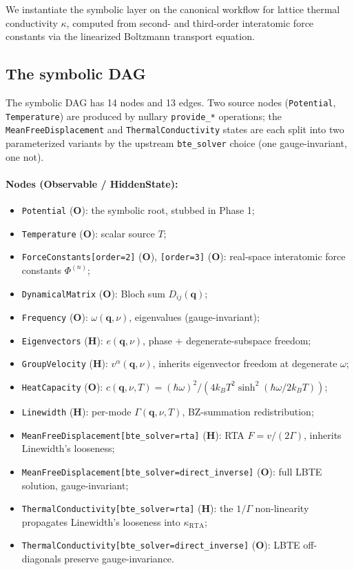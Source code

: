 \documentclass[11pt,a4paper]{article}
\begin{document}
We instantiate the symbolic layer on the canonical workflow for lattice thermal conductivity $\kappa$,
computed from second- and third-order interatomic force constants via the linearized Boltzmann
transport equation.

\subsection{The symbolic DAG}

The symbolic DAG has 14 nodes and 13 edges. Two source nodes (\texttt{Potential},
\texttt{Temperature}) are produced by nullary \texttt{provide\_*} operations; the
\texttt{MeanFreeDisplacement} and \texttt{ThermalConductivity} states are each split
into two parameterized variants by the upstream \texttt{bte\_solver} choice (one
gauge-invariant, one not).

\paragraph{Nodes (Observable / HiddenState):}
\begin{itemize}[leftmargin=2em, itemsep=0.2em]
  \item \texttt{Potential} (\textbf{O}): the symbolic root, stubbed in Phase 1;
  \item \texttt{Temperature} (\textbf{O}): scalar source $T$;
  \item \texttt{ForceConstants[order=2]} (\textbf{O}), \texttt{[order=3]} (\textbf{O}):
        real-space interatomic force constants $\Phi^{(n)}$;
  \item \texttt{DynamicalMatrix} (\textbf{O}): Bloch sum $D_{ij}(\mathbf{q})$;
  \item \texttt{Frequency} (\textbf{O}): $\omega(\mathbf{q},\nu)$, eigenvalues
        (gauge-invariant);
  \item \texttt{Eigenvectors} (\textbf{H}): $e(\mathbf{q},\nu)$, phase $+$
        degenerate-subspace freedom;
  \item \texttt{GroupVelocity} (\textbf{H}): $v^\alpha(\mathbf{q},\nu)$, inherits
        eigenvector freedom at degenerate $\omega$;
  \item \texttt{HeatCapacity} (\textbf{O}): $c(\mathbf{q},\nu, T) = (\hbar\omega)^2 /
        (4 k_B T^2 \sinh^2(\hbar\omega / 2 k_B T))$;
  \item \texttt{Linewidth} (\textbf{H}): per-mode $\Gamma(\mathbf{q},\nu, T)$,
        BZ-summation redistribution;
  \item \texttt{MeanFreeDisplacement[bte\_solver=rta]} (\textbf{H}): RTA
        $F = v/(2\Gamma)$, inherits Linewidth's looseness;
  \item \texttt{MeanFreeDisplacement[bte\_solver=direct\_inverse]} (\textbf{O}): full
        LBTE solution, gauge-invariant;
  \item \texttt{ThermalConductivity[bte\_solver=rta]} (\textbf{H}): the $1/\Gamma$
        non-linearity propagates Linewidth's looseness into $\kappa_\text{RTA}$;
  \item \texttt{ThermalConductivity[bte\_solver=direct\_inverse]} (\textbf{O}):
        LBTE off-diagonals preserve gauge-invariance.
\end{itemize}
\end{document}
